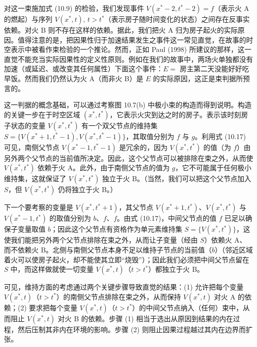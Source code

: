 对这一束施加式 \textup{(10.9)} 的检验，我们发现事件 $V(x^*-2,t^*-2)=f$（表示火 A 的燃起）与序列 $V(x^*,t),\,t>t^*$（表示房子随时间变化的状态）之间存在反事实依赖。对火 B 则不存在这样的依赖。据此，我们把火 A 归为房子起火的实际原因。值得注意的是，把因果性归于加速结果发生之事件这一常见直觉，在故事的时空表示中被看作束检验的一个推论。然而，正如 Paul (1998) 所建议的那样，这一直觉不能充当实际因果性的定义性原则。例如在我们的故事中，两场火单独都没有加速（或延迟、或改变其任何属性）下面这个事件：$E=$ 房主第二天没能好好吃早饭。然而我们仍然认为火 A（而非火 B）是 $E$ 的实际原因，这正是束判据所预言的。

这一判据的概念基础，可以通过考察图 10.7(b) 中极小束的构造而得到说明。构造的关键一步在于时空区域 $(x^*,t^*)$，它表示火灾到达之时的房子。表示该时刻房子状态的变量 $V(x^*,t^*)$ 有一个双父节点的维持集 $S=\{V(x^*+1,t^*-1),V(x^*,t^*-1)\}$，其取值分别为 $f$ 与 $g$。利用式 \textup{(10.17)} 可见，南侧父节点 $V(x^*-1,t^*-1)$ 是冗余的，因为 $V(x^*,t^*)$ 的值（为 $f$）由另外两个父节点的当前值所决定。因此，这个父节点可以被排除在束之外，从而使 $V(x^*,t^*)$ 依赖于火 A。此外，由于南侧父节点的值为 $g$，它不可能属于任何极小维持集，这就保证了 $V(x^*,t^*)$ 独立于火 B。（当然，我们可以把这个父节点加入 $S$，但 $V(x^*,t^*)$ 仍将独立于火 B。）

下一个要考察的变量是 $V(x^*,t^*+1)$，其父节点 $V(x^*+1,t^*)$、$V(x^*,t^*)$ 与 $V(x^*-1,t^*)$ 的取值分别为 $b$、$f$、$f$。由式 \textup{(10.17)}，中间父节点的值 $f$ 已足以确保子变量取值 $b$；因此这个父节点有资格作为单元素维持集 $S=\{V(x^*,t^*)\}$，这使我们能把另外两个父节点排除在束之外，从而让子变量（经由 $S$）依赖火 A、而不依赖火 B。北侧与南侧父节点本身不足以维持子节点的当前值（$b$）（邻近区域着火可以使房子起火，却不能使其立即“烧毁”）；因此我们必须把中间父节点留在 $S$ 中，而这样做就使一切变量 $V(x^*,t)$（$t>t^*$）都独立于火 B。

可见，维持方面的考虑通过两个关键步骤导致直觉的结果：(1) 允许把每个变量 $V(x^*,t)$（$t>t^*$）的南侧父节点排除在束之外，从而保持 $V(x^*,t)$ 对火 A 的依赖；(2) 要求把每个变量 $V(x^*,t)$（$t>t^*$）的中间父节点纳入（任何）束中，从而阻止 $V(x^*,t)$ 对火 B 的依赖。步骤 (1) 相当于选出从原因到结果的内在过程，然后压制其非内在环境的影响。步骤 (2) 则阻止因果过程越过其内在边界而扩张。


